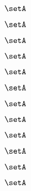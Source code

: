 \begin{forslides}
    \begin{equation}
        \label{eq:slides-translation-93}
        \setA
    \end{equation}

    \begin{equation}
        \label{eq:slides-translation-94}
        \setA
    \end{equation}

    \begin{equation}
        \label{eq:slides-translation-95}
        \setA
    \end{equation}

    \begin{equation}
        \label{eq:slides-translation-96}
        \setA
    \end{equation}

    \begin{equation}
        \label{eq:slides-translation-97}
        \setA
    \end{equation}

    \begin{equation}
        \label{eq:slides-translation-98}
        \setA
    \end{equation}

    \begin{equation}
        \label{eq:slides-translation-99}
        \setA
    \end{equation}
    
    \begin{equation}
        \label{eq:slides-translation-100}
        \setA
    \end{equation}

    \begin{equation}
        \label{eq:slides-translation-111}
        \setA
    \end{equation}

    \begin{equation}
        \label{eq:slides-translation-112}
        \setA
    \end{equation}

    \begin{equation}
        \label{eq:slides-translation-113}
        \setA
    \end{equation}

    \begin{equation}
        \label{eq:slides-translation-114}
        \setA
    \end{equation}


\end{forslides}
